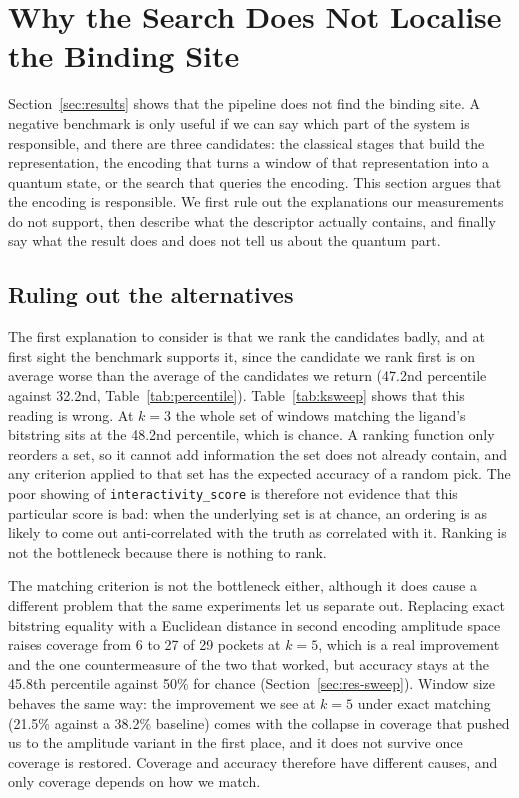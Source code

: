 \section{Why the Search Does Not Localise the Binding Site}
\label{sec:why}

Section~\ref{sec:results} shows that the pipeline does not find the binding site. A
negative benchmark is only useful if we can say which part of the system is responsible,
and there are three candidates: the classical stages that build the representation, the
encoding that turns a window of that representation into a quantum state, or the search
that queries the encoding. This section argues that the encoding is responsible. We first
rule out the explanations our measurements do not support, then describe what the
descriptor actually contains, and finally say what the result does and does not tell us
about the quantum part.

\subsection{Ruling out the alternatives}
\label{sec:why-not}

The first explanation to consider is that we rank the candidates badly, and at first
sight the benchmark supports it, since the candidate we rank first is on average worse
than the average of the candidates we return (47.2nd percentile against 32.2nd,
Table~\ref{tab:percentile}). Table~\ref{tab:ksweep} shows that this reading is wrong. At
$k=3$ the whole set of windows matching the ligand's bitstring sits at the 48.2nd
percentile, which is chance. A ranking function only reorders a set, so it cannot add
information the set does not already contain, and any criterion applied to that set has
the expected accuracy of a random pick. The poor showing of \texttt{interactivity\_score}
is therefore not evidence that this particular score is bad: when the underlying set is
at chance, an ordering is as likely to come out anti-correlated with the truth as
correlated with it. Ranking is not the bottleneck because there is nothing to rank.

The matching criterion is not the bottleneck either, although it does cause a different
problem that the same experiments let us separate out. Replacing exact bitstring equality
with a Euclidean distance in second encoding amplitude space raises coverage from 6 to 27
of 29 pockets at $k=5$, which is a real improvement and the one countermeasure of the two
that worked, but accuracy stays at the 45.8th percentile against 50\% for chance
(Section~\ref{sec:res-sweep}). Window size behaves the same way: the improvement we see
at $k=5$ under exact matching (21.5\% against a 38.2\% baseline) comes with the collapse
in coverage that pushed us to the amplitude variant in the first place, and it does not
survive once coverage is restored. Coverage and accuracy therefore have different causes,
and only coverage depends on how we match.

